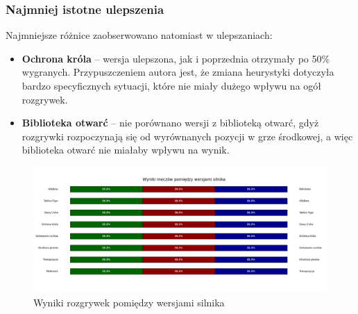 \subsubsection{Najmniej istotne ulepszenia}
Najmniejsze różnice zaobserwowano natomiast w ulepszaniach:
\begin{itemize}
    \item \textbf{Ochrona króla} – wersja ulepszona, jak i poprzednia otrzymały po 50\% wygranych.
    Przypuszczeniem autora jest, że zmiana heurystyki dotyczyła bardzo specyficznych sytuacji, które nie miały dużego wpływu na ogół rozgrywek.
    \item \textbf{Biblioteka otwarć} – nie porównano wersji z biblioteką otwarć, gdyż rozgrywki rozpoczynają się od wyrównanych pozycji w grze środkowej, a więc biblioteka otwarć nie miałaby wpływu na wynik.
\end{itemize}

\begin{figure}[ht]
    \centering
    \includegraphics[width=1\linewidth]{rozdzialy/rozdzial03/1_porownanie-wersji-silnika/rysunki/gry-wyniki}
    \caption{Wyniki rozgrywek pomiędzy wersjami silnika}
    \label{fig:wyniki-wersje}
\end{figure}
